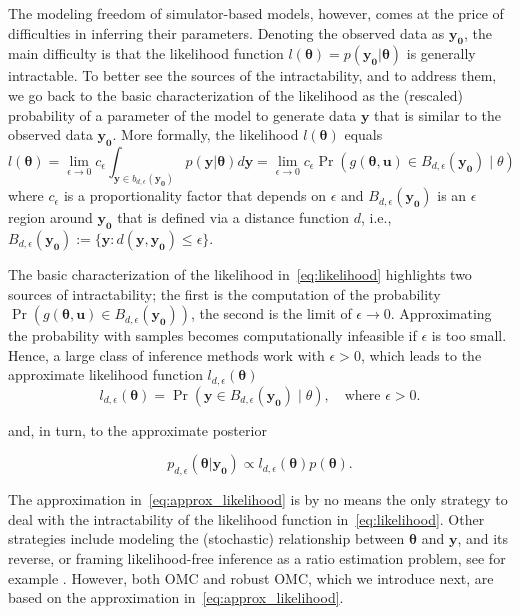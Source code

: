 \documentclass[article]{jss}
\newcommand{\ub}{\mathbf{u}}
\newcommand{\yb}{\mathbf{y}}
\newcommand{\thetab}{\boldsymbol{\theta}}
\newcommand{\simulator}{g}
\newcommand{\region}{B_{d,\epsilon}}
\newcommand{\data}{\mathbf{y_0}}
\begin{document}
The modeling freedom of simulator-based models, however, comes at the
price of difficulties in inferring their parameters. Denoting the
observed data as \(\data\), the main difficulty is that the likelihood
function \(l(\thetab) = p(\data|\thetab)\) is generally
intractable. To better see the sources of the intractability, and to
address them, we go back to the basic characterization of the
likelihood as the (rescaled) probability of a parameter of the model
to generate data \(\yb\) that is similar to the observed data
\(\data\). More formally, the likelihood \(l(\thetab)\) equals
\begin{equation} \label{eq:likelihood}
  l(\thetab) = \lim_{\epsilon \to 0} c_\epsilon \int_{\yb \in b_{d,\epsilon}(\data)} p(\yb|\thetab)d\yb =
  \lim_{\epsilon \to 0} c_\epsilon \Pr(\simulator(\thetab, \ub) \in \region(\data)  \mid \theta)
\end{equation}
where \(c_\epsilon\) is a proportionality factor that depends on
\(\epsilon\) and \(\region(\data)\) is an \(\epsilon\) region around \(\data\)
that is defined via a distance function \(d\), i.e., \ \(\region(\data)
:= \{\yb: d(\yb, \data) \leq \epsilon \}\).

The basic characterization of the likelihood in~\eqref{eq:likelihood}
highlights two sources of intractability; the first is the computation
of the probability
\(\Pr(\simulator(\thetab,\ub) \in \region(\data))\), the second is the
limit of \(\epsilon \to 0\). Approximating the probability with
samples becomes computationally infeasible if \(\epsilon\) is too
small. Hence, a large class of inference methods work with
\(\epsilon > 0\), which leads to the approximate likelihood function
\(l_{d, \epsilon}(\thetab)\)
\begin{equation} \label{eq:approx_likelihood}
  l_{d, \epsilon}(\thetab) = \Pr(\yb \in \region(\data) \mid \theta), \quad \text{where  } \epsilon > 0.
\end{equation}

and, in turn, to the approximate posterior

\begin{equation} \label{eq:approx_posterior}
  p_{d,\epsilon}(\thetab|\data) \propto l_{d, \epsilon}(\thetab) p(\thetab).
\end{equation}

The approximation in~\eqref{eq:approx_likelihood} is by no means the
only strategy to deal with the intractability of the likelihood
function in~\eqref{eq:likelihood}. Other strategies include modeling
the (stochastic) relationship between \(\thetab\) and \(\yb\), and its
reverse, or framing likelihood-free inference as a ratio estimation
problem, see for example \citet{blum2010, Wood2006, Papamakarios2016,
  Papamakarios2019, Chen2019, Thomas2020, Hermans2020}. However, both
OMC and robust OMC, which we introduce next, are based on the
approximation in~\eqref{eq:approx_likelihood}.
\end{document}
